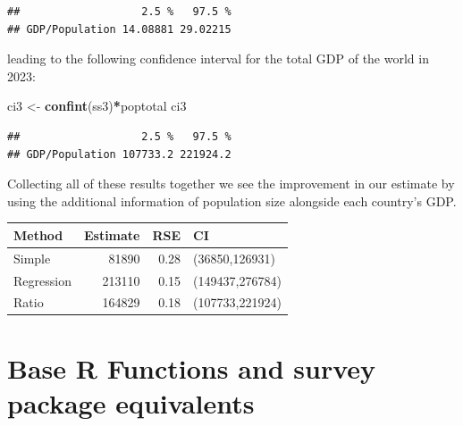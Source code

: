 \documentclass[
]{book}
\newenvironment{Shaded}{\begin{snugshade}}{\end{snugshade}}
\newcommand{\FunctionTok}[1]{\textcolor[rgb]{0.13,0.29,0.53}{\textbf{#1}}}
\newcommand{\NormalTok}[1]{#1}
\newcommand{\OtherTok}[1]{\textcolor[rgb]{0.56,0.35,0.01}{#1}}
\newcommand{\SpecialCharTok}[1]{\textcolor[rgb]{0.81,0.36,0.00}{\textbf{#1}}}
\begin{document}
\begin{verbatim}
##                   2.5 %   97.5 %
## GDP/Population 14.08881 29.02215
\end{verbatim}

leading to the following confidence interval for the total GDP of the world in 2023:

\begin{Shaded}
\begin{Highlighting}[]
\NormalTok{ci3 }\OtherTok{\textless{}{-}} \FunctionTok{confint}\NormalTok{(ss3)}\SpecialCharTok{*}\NormalTok{poptotal}
\NormalTok{ci3}
\end{Highlighting}
\end{Shaded}

\begin{verbatim}
##                   2.5 %   97.5 %
## GDP/Population 107733.2 221924.2
\end{verbatim}

Collecting all of these results together we see the improvement in our estimate
by using the additional information of population size alongside each country's GDP.

\begin{table}
\centering
\begin{tabular}[t]{l|r|r|l}
\hline
Method & Estimate & RSE & CI\\
\hline
Simple & 81890 & 0.28 & (36850,126931)\\
\hline
Regression & 213110 & 0.15 & (149437,276784)\\
\hline
Ratio & 164829 & 0.18 & (107733,221924)\\
\hline
\end{tabular}
\end{table}

\section{Base R Functions and survey package equivalents}\label{base-r-functions-and-survey-package-equivalents}
\end{document}
